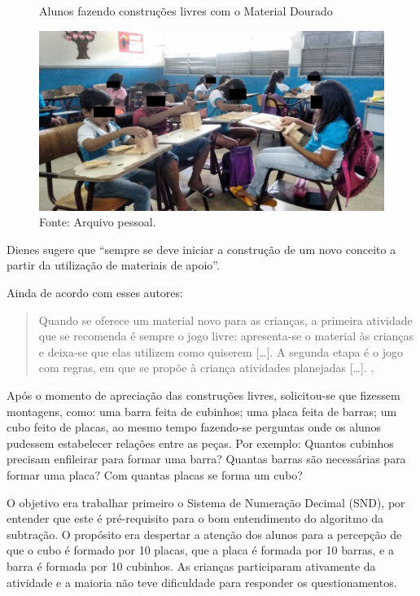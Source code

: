 \begin{refsection}
    \begin{figure}[ht]%
        \centering%
        \caption{Alunos fazendo construções livres com o Material Dourado}%
        \includegraphics[width=.5\textwidth]{articles/05-material-dourado-com/figura3.jpeg}%
        \caption*{Fonte: Arquivo pessoal.}%
        \label{fig:construcoes-livres-material-dourado}%
    \end{figure}%

    Dienes \cite[apud][p.~34]{TOLEDOAndTOLEDO1997Didática} sugere que “sempre se deve iniciar a construção de um novo conceito a partir da utilização de materiais de apoio”.

    Ainda de acordo com esses autores: 

    \begin{quotation}
        Quando se oferece um material novo para as crianças, a primeira atividade que se recomenda é sempre o jogo livre: apresenta-se o material às crianças e deixa-se que elas utilizem como quiserem [\dots]. A segunda etapa é o jogo com regras, em que se propõe à criança atividades planejadas [\dots]. \cite[p.~72--73]{TOLEDOAndTOLEDO1997Didática}.
    \end{quotation}

    Após o momento de apreciação das construções livres, solicitou-se que fizessem montagens, como: uma barra feita de cubinhos; uma placa feita de barras; um cubo feito de placas, ao mesmo tempo fazendo-se perguntas onde os alunos pudessem estabelecer relações entre as peças. Por exemplo: Quantos cubinhos precisam enfileirar para formar uma barra? Quantas barras são necessárias para formar uma placa? Com quantas placas se forma um cubo?  

    O objetivo era trabalhar primeiro o Sistema de Numeração Decimal (SND), por entender que este é pré-requisito para o bom entendimento do algoritmo da subtração. O propósito era despertar a atenção dos alunos para a percepção de que o cubo é formado por 10 placas, que a placa é formada por 10 barras, e a barra é formada por 10 cubinhos. As crianças participaram ativamente da atividade e a maioria não teve dificuldade para responder os questionamentos. 


\end{refsection}
